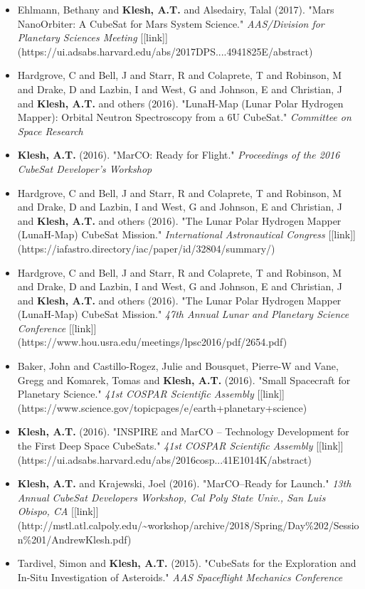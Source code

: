 \documentclass[11pt,letterpaper]{article}
\begin{document}
\begin{itemize}
\item Ehlmann, Bethany and \textbf{Klesh, A.T.} and Alsedairy, Talal (2017). "Mars NanoOrbiter: A CubeSat for Mars System Science." \textit{AAS/Division for Planetary Sciences Meeting} [[link]](https://ui.adsabs.harvard.edu/abs/2017DPS....4941825E/abstract)
\item Hardgrove, C and Bell, J and Starr, R and Colaprete, T and Robinson, M and Drake, D and Lazbin, I and West, G and Johnson, E and Christian, J and \textbf{Klesh, A.T.} and others (2016). "LunaH-Map (Lunar Polar Hydrogen Mapper): Orbital Neutron Spectroscopy from a 6U CubeSat." \textit{Committee on Space Research}
\item \textbf{Klesh, A.T.} (2016). "MarCO: Ready for Flight." \textit{Proceedings of the 2016 CubeSat Developer's Workshop}
\item Hardgrove, C and Bell, J and Starr, R and Colaprete, T and Robinson, M and Drake, D and Lazbin, I and West, G and Johnson, E and Christian, J and \textbf{Klesh, A.T.} and others (2016). "The Lunar Polar Hydrogen Mapper (LunaH-Map) CubeSat Mission." \textit{International Astronautical Congress} [[link]](https://iafastro.directory/iac/paper/id/32804/summary/)
\item Hardgrove, C and Bell, J and Starr, R and Colaprete, T and Robinson, M and Drake, D and Lazbin, I and West, G and Johnson, E and Christian, J and \textbf{Klesh, A.T.} and others (2016). "The Lunar Polar Hydrogen Mapper (LunaH-Map) CubeSat Mission." \textit{47th Annual Lunar and Planetary Science Conference} [[link]](https://www.hou.usra.edu/meetings/lpsc2016/pdf/2654.pdf)
\item Baker, John and Castillo-Rogez, Julie and Bousquet, Pierre-W and Vane, Gregg and Komarek, Tomas and \textbf{Klesh, A.T.} (2016). "Small Spacecraft for Planetary Science." \textit{41st COSPAR Scientific Assembly} [[link]](https://www.science.gov/topicpages/e/earth+planetary+science)
\item \textbf{Klesh, A.T.} (2016). "INSPIRE and MarCO -- Technology Development for the First Deep Space CubeSats." \textit{41st COSPAR Scientific Assembly} [[link]](https://ui.adsabs.harvard.edu/abs/2016cosp...41E1014K/abstract)
\item \textbf{Klesh, A.T.} and Krajewski, Joel (2016). "MarCO--Ready for Launch." \textit{13th Annual CubeSat Developers Workshop, Cal Poly State Univ., San Luis Obispo, CA} [[link]](http://mstl.atl.calpoly.edu/\textasciitilde{}workshop/archive/2018/Spring/Day\%202/Session\%201/AndrewKlesh.pdf)
\item Tardivel, Simon and \textbf{Klesh, A.T.} (2015). "CubeSats for the Exploration and In-Situ Investigation of Asteroids." \textit{AAS Spaceflight Mechanics Conference}

\end{itemize}
\end{document}
